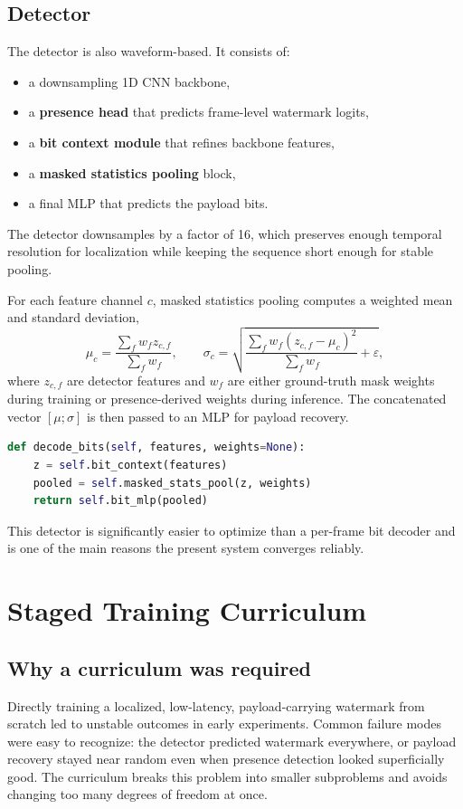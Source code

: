 \subsection{Detector}
The detector is also waveform-based. It consists of:
\begin{itemize}[leftmargin=1.25em]
  \item a downsampling 1D CNN backbone,
  \item a \textbf{presence head} that predicts frame-level watermark logits,
  \item a \textbf{bit context module} that refines backbone features,
  \item a \textbf{masked statistics pooling} block,
  \item a final MLP that predicts the payload bits.
\end{itemize}
The detector downsamples by a factor of 16, which preserves enough temporal resolution for localization while keeping the sequence short enough for stable pooling.

For each feature channel $c$, masked statistics pooling computes a weighted mean and standard deviation,
\begin{equation}
  \mu_c = \frac{\sum_f w_f z_{c,f}}{\sum_f w_f},
  \qquad
  \sigma_c = \sqrt{\frac{\sum_f w_f(z_{c,f}-\mu_c)^2}{\sum_f w_f} + \varepsilon},
\end{equation}
where $z_{c,f}$ are detector features and $w_f$ are either ground-truth mask weights during training or presence-derived weights during inference. The concatenated vector $[\mu;\sigma]$ is then passed to an MLP for payload recovery.

\begin{lstlisting}[language=Python,caption={Simplified payload decoding with masked statistics pooling.},label={lst:masked_pool}]
def decode_bits(self, features, weights=None):
    z = self.bit_context(features)
    pooled = self.masked_stats_pool(z, weights)
    return self.bit_mlp(pooled)
\end{lstlisting}

This detector is significantly easier to optimize than a per-frame bit decoder and is one of the main reasons the present system converges reliably.

\section{Staged Training Curriculum}\label{sec:curriculum}
\subsection{Why a curriculum was required}
Directly training a localized, low-latency, payload-carrying watermark from scratch led to unstable outcomes in early experiments. Common failure modes were easy to recognize: the detector predicted watermark everywhere, or payload recovery stayed near random even when presence detection looked superficially good. The curriculum breaks this problem into smaller subproblems and avoids changing too many degrees of freedom at once.

